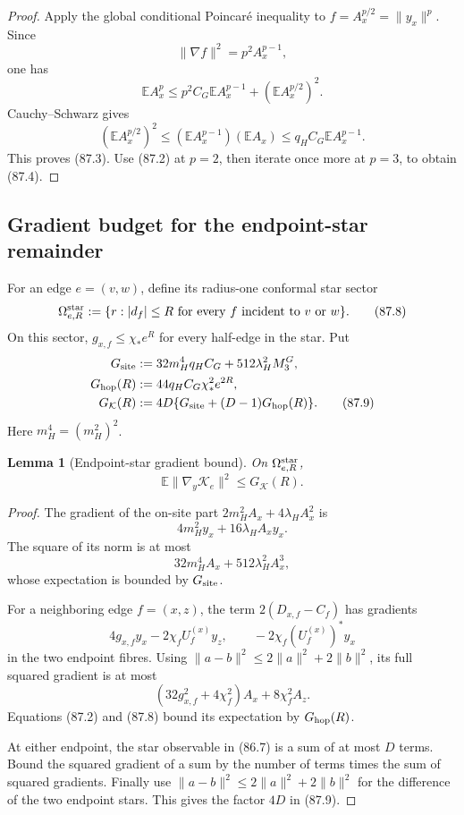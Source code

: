\documentclass[11pt]{article}
\newtheorem{lemma}[theorem]{Lemma}
\theoremstyle{remark}
\begin{document}
\begin{proof}
Apply the global conditional Poincar\'e inequality to
\(f=A_x^{p/2}=\|y_x\|^p\).  Since
\[
 \|\nabla f\|^2=p^2A_x^{p-1},                    \tag{87.5}
\]
one has
\[
 \mathbb EA_x^p
 \leq p^2C_G\mathbb EA_x^{p-1}
      +(\mathbb EA_x^{p/2})^2.                   \tag{87.6}
\]
Cauchy--Schwarz gives
\[
 (\mathbb EA_x^{p/2})^2
 \leq(\mathbb EA_x^{p-1})(\mathbb EA_x)
 \leq q_HC_G\mathbb EA_x^{p-1}.                 \tag{87.7}
\]
This proves (87.3).  Use (87.2) at \(p=2\), then iterate once more at
\(p=3\), to obtain (87.4).
\end{proof}

\subsection{Gradient budget for the endpoint-star remainder}

For an edge \(e=(v,w)\), define its radius-one conformal star sector
\[
 \Omega_{e,R}^{\rm star}
 :=\{r:|d_f|\leq R\text{ for every }f\text{ incident to }v
                  \text{ or }w\}.                \tag{87.8}
\]
On this sector, \(g_{x,f}\leq\chi_*e^R\) for every half-edge in the
star.  Put
\[
\begin{aligned}
 G_{\rm site}
 &:=32m_H^4q_HC_G+512\lambda_H^2M_3^G,\\
 G_{\rm hop}(R)
 &:=44q_HC_G\chi_*^2e^{2R},\\
 G_{\mathcal K}(R)
 &:=4D\{G_{\rm site}+(D-1)G_{\rm hop}(R)\}.       \tag{87.9}
\end{aligned}
\]
Here \(m_H^4=(m_H^2)^2\).

\begin{lemma}[Endpoint-star gradient bound]
\label{lem:v17v87-gradient}
On \(\Omega_{e,R}^{\rm star}\),
\[
\boxed{
 \mathbb E\|\nabla_y\mathcal K_e\|^2
 \leq G_{\mathcal K}(R).}                        \tag{87.10}
\]
\end{lemma}

\begin{proof}
The gradient of the on-site part
\(2m_H^2A_x+4\lambda_HA_x^2\) is
\[
 4m_H^2y_x+16\lambda_HA_xy_x.
\]
The square of its norm is at most
\[
 32m_H^4A_x+512\lambda_H^2A_x^3,                 \tag{87.11}
\]
whose expectation is bounded by \(G_{\rm site}\).

For a neighboring edge \(f=(x,z)\), the term
\(2(D_{x,f}-C_f)\) has gradients
\[
 4g_{x,f}y_x-2\chi_fU_f^{(x)}y_z,
 \qquad -2\chi_f(U_f^{(x)})^*y_x                \tag{87.12}
\]
in the two endpoint fibres.  Using
\(\|a-b\|^2\leq2\|a\|^2+2\|b\|^2\), its full
squared gradient is at most
\[
 (32g_{x,f}^2+4\chi_f^2)A_x+8\chi_f^2A_z.        \tag{87.13}
\]
Equations (87.2) and (87.8) bound its expectation by
\(G_{\rm hop}(R)\).

At either endpoint, the star observable in (86.7) is a sum of at most
\(D\) terms.  Bound the squared gradient of a sum by the number of
terms times the sum of squared gradients.  Finally use
\(\|a-b\|^2\leq2\|a\|^2+2\|b\|^2\) for the difference of the two
endpoint stars.  This gives the factor \(4D\) in (87.9).
\end{proof}
\end{document}

